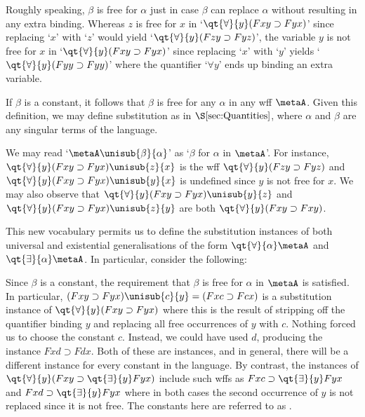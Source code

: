 
Roughly speaking, $\beta$ is free for $\alpha$ just in case $\beta$ can replace $\alpha$ without resulting in any extra binding.
Whereas $z$ is free for $x$ in `$\qt{\forall}{y}(Fxy \supset Fyx)$' since replacing `$x$' with `$z$' would yield `$\qt{\forall}{y}(Fzy \supset Fyz)$', the variable $y$ is not free for $x$ in `$\qt{\forall}{y}(Fxy \supset Fyx)$' since replacing `$x$' with `$y$' yields `$\qt{\forall}{y}(Fyy \supset Fyy)$' where the quantifier `$\forall y$' ends up binding an extra variable.

If $\beta$ is a constant, it follows that $\beta$ is free for any $\alpha$ in any wff $\metaA$. 
Given this definition, we may define substitution as in $\S\ref{sec:Quantities}$, where $\alpha$ and $\beta$ are any singular terms of the language.


We may read `$\metaA\unisub{\beta}{\alpha}$' as `$\beta$ for $\alpha$ in $\metaA$'.
For instance, $\qt{\forall}{y}(Fxy \supset Fyx)\unisub{z}{x}$ is the wff $\qt{\forall}{y}(Fzy \supset Fyz)$ and $\qt{\forall}{y}(Fxy \supset Fyx)\unisub{y}{x}$ is undefined since $y$ is not free for $x$.
We may also observe that $\qt{\forall}{y}(Fxy \supset Fyx)\unisub{y}{z}$ and $\qt{\forall}{y}(Fxy \supset Fyx)\unisub{z}{y}$ are both $\qt{\forall}{y}(Fxy \supset Fxy)$.

This new vocabulary permits us to define the substitution instances of both universal and existential generalisations of the form $\qt{\forall}{\alpha}\metaA$ and $\qt{\exists}{\alpha}\metaA$.
In particular, consider the following:


Since $\beta$ is a constant, the requirement that $\beta$ is free for $\alpha$ in $\metaA$ is satisfied.
In particular, $(Fxy \supset Fyx)\unisub{c}{y}=(Fxc \supset Fcx)$ is a substitution instance of $\qt{\forall}{y}(Fxy \supset Fyx)$ where this is the result of stripping off the quantifier binding $y$ and replacing all free occurrences of $y$ with $c$. 
Nothing forced us to choose the constant $c$.
Instead, we could have used $d$, producing the instance $Fxd \supset Fdx$.
Both of these are instances, and in general, there will be a different instance for every constant in the language.
By contrast, the instances of $\qt{\forall}{y}(Fxy \supset \qt{\exists}{y}Fyx)$ include such wffs as $Fxc \supset \qt{\exists}{y}Fyx$ and $Fxd \supset \qt{\exists}{y}Fyx$ where in both cases the second occurrence of $y$ is not replaced since it is not free. 
The constants here are referred to as .




